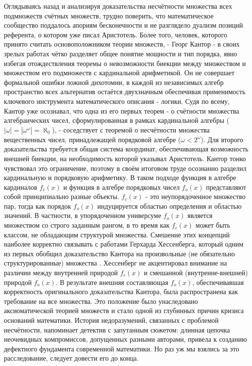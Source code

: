 \documentclass[12pt]{article}
\begin{document}
Оглядываясь назад и анализируя доказательства несчётности множества всех подмножеств счётных множеств, трудно поверить, что математическое сообщество поддалось апориям бесконечности и не разглядело дуализм позиций референта, о котором уже писал Аристотель. Более того, человек, которого принято считать основоположником теории множеств, - Георг Кантор - в своих зрелых работах чётко разделяет общее понятие мощности и тип порядка, явно избегая отождествления теоремы о невозможности биекции между множеством и множеством его подмножеств с кардинальной арифметикой. Он не совершает формальной ошибки ложной дихотомии, в каждой из независимых алгебр пространство всех альтернатив остаётся двухзначным обеспечивая применимость ключевого инструмента математического описания - логики. Судя по всему, Кантор уже осознавал, что одна из его первых теорем - о счётности множества алгебраических чисел, сформулированная в рамках кардинальной алгебры ($|\omega| = |\omega^\omega| = \aleph_0$), - соседствует с теоремой о несчётности множества вещественных чисел, принадлежащей порядковой алгебре ($\omega < 2^\omega$). Для второго доказательства требуется общая система координат, обеспечивающая возможность внешней биекции, на необходимость которой указывал Аристотель. Кантор тонко чувствовал это ограничение, поэтому в своём итоговом труде осознанно разделил кардинальную и порядковую арифметику. В таком подходе функция в алгебре кардиналов $f_c(x)$ и функция в алгебре порядковых чисел $f_o(x)$ представляют собой принципиально разные объекты. $f_c(x)$ - это неупорядоченное множество пар, тогда как порядок $f_o(x)$ индуцируется областью определения и областью значений. В частности, в упорядоченном универсуме $f_o(x)$ является множеством со строго заданным рангом, в то время как $f_c(x)$ может быть классом, не обладающим структурой множества. Смешение этих концепций наиболее корректно связывать с работами Герхарда Хессенберга, который одним из первых обобщил доказательство Кантора на произвольные (не обязательно структурированные) множества \cite{hessenberg}. Хессенберг не акцентировал внимание на различии между внутренней природой $f_c(x)$ и смешанной (внутренне-внешней) природой $f_o(x)$. В результате внешняя составляющая $f_o(x)$, обеспечивавшая корректность оригинального доказательства Кантора, была распространена как требование на все множества. Это положение было унаследовано аксиоматической теорией множеств и стало одной из глубинных причин кризиса оснований математики. История недоразумений, связанных с проблемой несчётности, напоминает детектив с запутанным сюжетом: длинная цепочка неочевидных компромиссов, допущенных разными авторами, привела к созданию дефектного фундамента современной математики. Но раз уж мы взялись за это расследование, следует довести его до конца.
\end{document}
